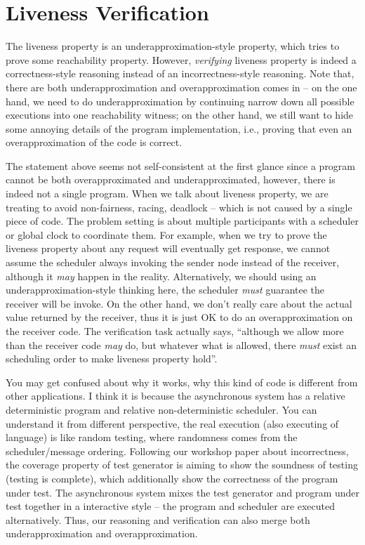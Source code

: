 \section{Liveness Verification}

The liveness property is an underapproximation-style property, which tries to prove some reachability property. However, \emph{verifying} liveness property is indeed a correctness-style reasoning instead of an incorrectness-style reasoning. Note that, there are both underapproximation and overapproximation comes in -- on the one hand, we need to do underapproximation by continuing narrow down all possible executions into one reachability witness; on the other hand, we still want to hide some annoying details of the program implementation, i.e., proving that even an overapproximation of the code is correct. 

The statement above seems not self-consistent at the first glance since a program cannot be both overapproximated and underapproximated, however, there is indeed not a single program. When we talk about liveness property, we are treating to avoid non-fairness, racing, deadlock -- which is not caused by a single piece of code. The problem setting is about multiple participants with a scheduler or global clock to coordinate them. For example, when we try to prove the liveness property about any request will eventually get response, we cannot assume the scheduler always invoking the sender node instead of the receiver, although it \emph{may} happen in the reality. Alternatively, we should using an underapproximation-style thinking here, the scheduler \emph{must} guarantee the receiver will be invoke. On the other hand, we don't really care about the actual value returned by the receiver, thus it is just OK to do an overapproximation on the receiver code. The verification task actually says, ``although we allow more than the receiver code \emph{may} do, but whatever what is allowed, there \emph{must} exist an scheduling order to make liveness property hold''.

You may get confused about why it works, why this kind of code is different from other applications. I think it is because the asynchronous system has a relative deterministic program and relative non-deterministic scheduler. You can understand it from different perspective, the real execution (also executing of  language) is like random testing, where randomness comes from the scheduler/message ordering. Following our workshop paper about incorrectness, the coverage property of test generator is aiming to show the soundness of testing (testing is complete), which additionally show the correctness of the program under test. The asynchronous system mixes the test generator and program under test together in a interactive style -- the program and scheduler are executed alternatively. Thus, our reasoning and verification can also merge both underapproximation and overapproximation.

